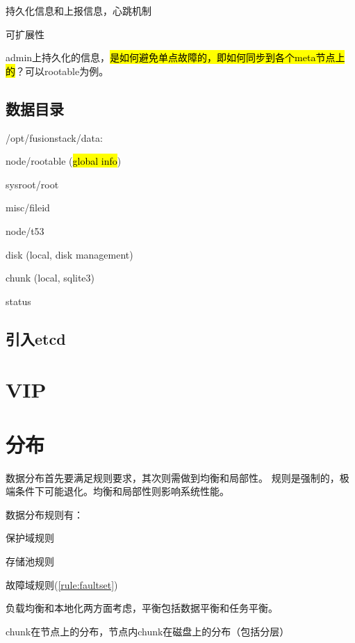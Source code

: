 持久化信息和上报信息，心跳机制

可扩展性

admin上持久化的信息，\hl{是如何避免单点故障的，即如何同步到各个meta节点上的}？可以rootable为例。

\subsection{数据目录}

/opt/fusionstack/data:
\begin{itembox}
\item node/rootable (\hl{global info})
    \begin{compactitem}
    \item sysroot/root
    \item misc/fileid
    \item node/t53
    \end{compactitem}
\item disk (local, disk management)
\item chunk (local, sqlite3)
\item status
\end{itembox}

\subsection{引入etcd}

\section{VIP}

\section{分布}

数据分布首先要满足规则要求，其次则需做到均衡和局部性。
规则是强制的，极端条件下可能退化。均衡和局部性则影响系统性能。

数据分布规则有：
\begin{compactitem}
\item 保护域规则
\item 存储池规则
\item 故障域规则(\ref{rule:faultset})
\end{compactitem}

负载均衡和本地化两方面考虑，平衡包括数据平衡和任务平衡。

chunk在节点上的分布，节点内chunk在磁盘上的分布（包括分层）

